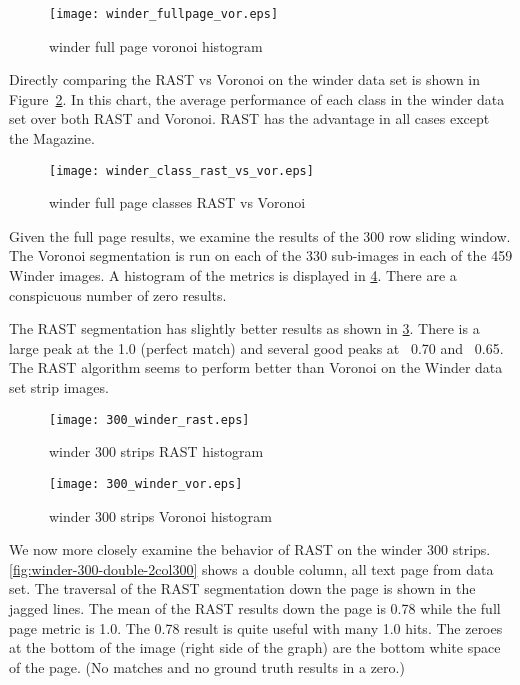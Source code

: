 \documentclass[conference]{IEEEtran}
\begin{document}
\begin{figure}[winder-fullpage-vor]
\texttt{[image: winder\_fullpage\_vor.eps]}
\caption{winder full page voronoi histogram}
\label{fig:winder-fullpage-vor}
\end{figure}

Directly comparing the RAST vs Voronoi on the winder data set is shown in
Figure~\ref{fig:winder-class-rast-vs-vor}. In this chart, the average
performance of each class in the winder data set over both RAST and Voronoi.
RAST has the advantage in all cases except the Magazine. 

\begin{figure}[winder-class-rast-vs-vor]
\texttt{[image: winder\_class\_rast\_vs\_vor.eps]}
\caption{winder full page classes RAST vs Voronoi}
\label{fig:winder-class-rast-vs-vor}
\end{figure}

Given the full page results, we examine the results of the 300 row sliding
window. The Voronoi segmentation is run on each of the 330 sub-images in each of
the 459 Winder images. A histogram of the metrics is displayed in
\ref{fig:300-winder-vor}. There are a conspicuous number of zero results. 

The RAST segmentation has slightly better results as shown in
\ref{fig:300-winder-rast}. There is a large peak at the 1.0 (perfect match) and
several good peaks at ~0.70 and ~0.65. The RAST algorithm seems to perform
better than Voronoi on the Winder data set strip images. 

\begin{figure}[300-winder-rast]
\texttt{[image: 300\_winder\_rast.eps]}
\caption{winder 300 strips RAST histogram}
\label{fig:300-winder-rast}
\end{figure}
\begin{figure}[300-winder-vor]
\texttt{[image: 300\_winder\_vor.eps]}
\caption{winder 300 strips Voronoi histogram}
\label{fig:300-winder-vor}
\end{figure}

We now more closely examine the behavior of RAST on the winder 300 strips.
\ref{fig:winder-300-double-2col300} shows a double column, all
text page from \cite{IEEEhowto:Winder} data set. The traversal of the RAST
segmentation down the page is shown in the jagged lines. The mean of the RAST
results down the page is 0.78 while the full page metric is 1.0.  The 0.78
result is quite useful with many 1.0 hits. The zeroes at the bottom of the
image (right side of the graph) are the bottom white space of the page. (No
matches and no ground truth results in a zero.)
\end{document}

